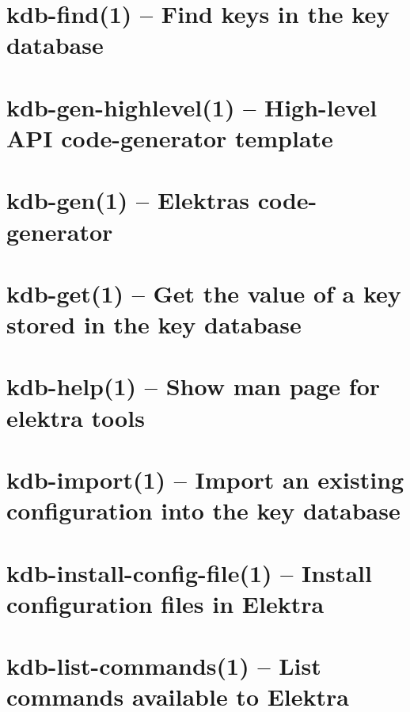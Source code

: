 \let\mypdfximage\pdfximage\def\pdfximage{\immediate\mypdfximage}\documentclass[twoside]{book}
\newcommand{\+}{\discretionary{\mbox{\scriptsize$\hookleftarrow$}}{}{}}
\begin{document}
\chapter{kdb-\/find(1) -- Find keys in the key database}
\label{doc_help_kdb-find_md}

\chapter{kdb-\/gen-\/highlevel(1) -- High-\/level API code-\/generator template}
\label{doc_help_kdb-gen-highlevel_md}

\chapter{kdb-\/gen(1) -- Elektra\textquotesingle{}s code-\/generator}
\label{doc_help_kdb-gen_md}

\chapter{kdb-\/get(1) -- Get the value of a key stored in the key database}
\label{doc_help_kdb-get_md}

\chapter{kdb-\/help(1) -- Show man page for elektra tools}
\label{doc_help_kdb-help_md}

\chapter{kdb-\/import(1) -- Import an existing configuration into the key database}
\label{doc_help_kdb-import_md}

\chapter{kdb-\/install-\/config-\/file(1) -- Install configuration files in Elektra}
\label{doc_help_kdb-install-config-file_md}

\chapter{kdb-\/list-\/commands(1) -- List commands available to Elektra}
\label{doc_help_kdb-list-commands_md}

\end{document}
